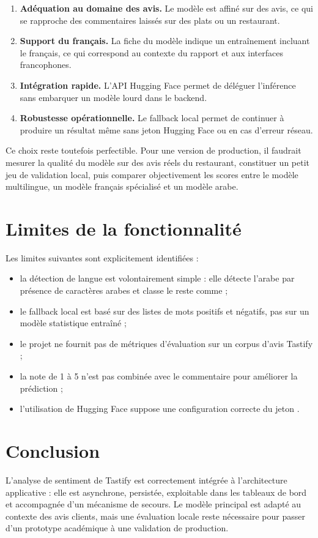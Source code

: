 \begin{enumerate}
  \item \textbf{Adéquation au domaine des avis.} Le modèle est affiné sur des avis, ce qui se rapproche des commentaires laissés sur des plats ou un restaurant.
  \item \textbf{Support du français.} La fiche du modèle indique un entraînement incluant le français, ce qui correspond au contexte du rapport et aux interfaces francophones.
  \item \textbf{Intégration rapide.} L'API Hugging Face permet de déléguer l'inférence sans embarquer un modèle lourd dans le backend.
  \item \textbf{Robustesse opérationnelle.} Le fallback local permet de continuer à produire un résultat même sans jeton Hugging Face ou en cas d'erreur réseau.
\end{enumerate}

Ce choix reste toutefois perfectible. Pour une version de production, il faudrait mesurer la qualité du modèle sur des avis réels du restaurant, constituer un petit jeu de validation local, puis comparer objectivement les scores entre le modèle multilingue, un modèle français spécialisé et un modèle arabe.

\section{Limites de la fonctionnalité}
Les limites suivantes sont explicitement identifiées :

\begin{itemize}
  \item la détection de langue est volontairement simple : elle détecte l'arabe par présence de caractères arabes et classe le reste comme  ;
  \item le fallback local est basé sur des listes de mots positifs et négatifs, pas sur un modèle statistique entraîné ;
  \item le projet ne fournit pas de métriques d'évaluation sur un corpus d'avis Tastify ;
  \item la note de 1 à 5 n'est pas combinée avec le commentaire pour améliorer la prédiction ;
  \item l'utilisation de Hugging Face suppose une configuration correcte du jeton .
\end{itemize}

\section*{Conclusion}
L'analyse de sentiment de Tastify est correctement intégrée à l'architecture applicative : elle est asynchrone, persistée, exploitable dans les tableaux de bord et accompagnée d'un mécanisme de secours. Le modèle principal est adapté au contexte des avis clients, mais une évaluation locale reste nécessaire pour passer d'un prototype académique à une validation de production.
